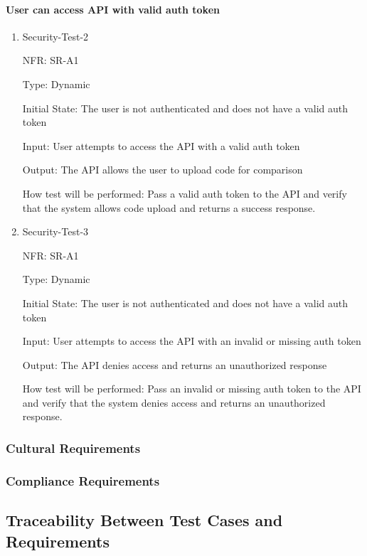 \documentclass[12pt, titlepage]{article}
\begin{document}
\paragraph{User can access API with valid auth token}
\begin{enumerate}
  \item{Security-Test-2\\}

  NFR: SR-A1

  Type: Dynamic
            
  Initial State: The user is not authenticated and does not have a valid auth token
            
  Input: User attempts to access the API with a valid auth token
            
  Output: The API allows the user to upload code for comparison
            
  How test will be performed: 
  Pass a valid auth token to the API and verify that the system allows code upload and returns a success response.

  \item{Security-Test-3}

  NFR: SR-A1

  Type: Dynamic

  Initial State: The user is not authenticated and does not have a valid auth token

  Input: User attempts to access the API with an invalid or missing auth token

  Output: The API denies access and returns an unauthorized response

  How test will be performed:
  Pass an invalid or missing auth token to the API and verify that the system denies access and returns an unauthorized response.

\end{enumerate}

\subsubsection{Cultural Requirements}

\subsubsection{Compliance Requirements}

\subsection{Traceability Between Test Cases and Requirements}
\end{document}
